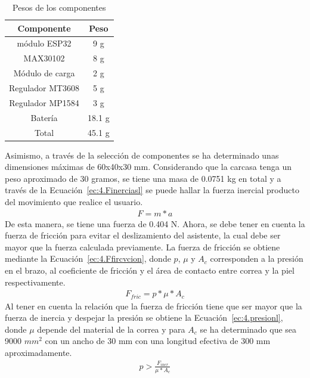     \begin{table}[H]
    \centering
    \caption{Pesos de los componentes}
    \label{tab:4.pESOS}
    \begin{tabular}{|c|c|} 
    \hline
    Componente       & Peso    \\ 
    \hline
    módulo ESP32     & 9 g     \\ 
    \hline
    MAX30102         & 8 g     \\ 
    \hline
    Módulo de carga  & 2 g     \\ 
    \hline
    Regulador MT3608 & 5 g     \\ 
    \hline
    Regulador MP1584 & 3 g     \\ 
    \hline
    Batería          & 18.1 g  \\ 
    \hhline{|==|}
    Total            & 45.1 g  \\
    \hline
    \end{tabular}
    \end{table}
Asimismo, a través de la selección de componentes se ha determinado unas dimensiones máximas de 60x40x30 mm. Considerando que la carcasa tenga un peso aproximado de 30 gramos, se tiene una masa de 0.0751 kg en total y a través de la Ecuación~\ref{ec:4.Finerciasl} se puede hallar la fuerza inercial producto del movimiento que realice el usuario.
\begin{align}
\label{ec:4.Finerciasl}
F=m*a
\end{align}
De esta manera, se tiene una fuerza de 0.404 N. Ahora, se debe tener en cuenta la fuerza de fricción para evitar el deslizamiento del asistente, la cual debe ser mayor que la fuerza calculada previamente. La fuerza de fricción se obtiene mediante la Ecuación~\ref{ec:4.Ffircvcion}, donde $p$, $\mu$ y $A_c$ corresponden a la presión en el brazo, al coeficiente de fricción y el área de contacto entre correa y la piel respectivamente.
\begin{align}
\label{ec:4.Ffircvcion}
F_{fric}=p*\mu*A_c
\end{align}
Al tener en cuenta la relación que la fuerza de fricción tiene que ser mayor que la fuerza de inercia y despejar la presión se obtiene la Ecuación~\ref{ec:4.presionl}, donde $\mu$ depende del material de la correa y para $A_c$ se ha determinado que sea 9000 $mm^2$ con un ancho de 30 mm con una longitud efectiva de 300 mm aproximadamente.
\begin{align}
\label{ec:4.presionl}
p>\frac{F_{iner}}{\mu*A_c}
\end{align}

